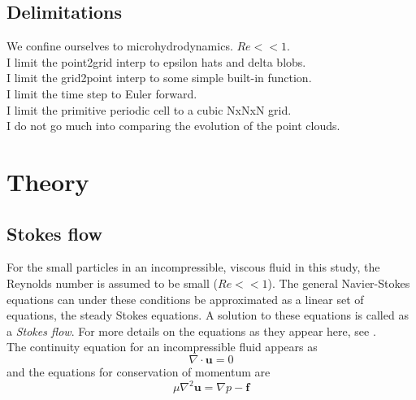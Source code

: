 \documentclass[a4paper,twoside=false,abstract=false,numbers=noenddot,
titlepage=false,headings=small,parskip=half,version=last]{scrartcl}
\begin{document}
\subsection{Delimitations}
We confine ourselves to microhydrodynamics. $Re<<1$.\\
I limit the point2grid interp to epsilon hats and delta blobs.\\
I limit the grid2point interp to some simple built-in function.\\
I limit the time step to Euler forward.\\
I limit the primitive periodic cell to a cubic NxNxN grid.\\
I do not go much into comparing the evolution of the point clouds.\\
\section{Theory}
\subsection{Stokes flow}
For the small particles in an incompressible, viscous fluid in this study, the Reynolds number is assumed to be small ($Re<<1$). The general Navier-Stokes equations can under these conditions be approximated as a linear set of equations, the steady Stokes equations. A solution to these equations is called as a \emph{Stokes flow}. For more details on the equations as they appear here, see \cite{guazzellibook}.\\
The continuity equation for an incompressible fluid appears as
\begin{equation}
\nabla \cdot \mathbf{u} = 0 \label{eq:incompressible}
\end{equation}
and the equations for conservation of momentum are
\begin{equation}
\mu \nabla^2 \mathbf{u} = \nabla p - \mathbf{f} \label{eq:stokesequations}
\end{equation}
\end{document}
